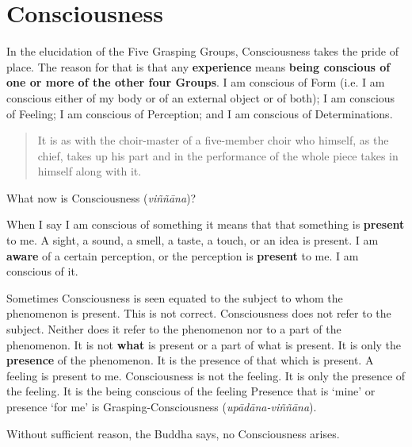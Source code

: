 \chapter{Consciousness}

In the elucidation of the Five Grasping Groups, Consciousness takes the pride of place. The reason for that is that any \textbf{experience} means \textbf{being conscious of one or more of the other four Groups}. I am conscious of Form (i.e. I am conscious either of my body or of an external object or of both); I am conscious of Feeling; I am conscious of Perception; and I am conscious of Determinations.

\begin{quote}
It is as with the choir-master of a five-member choir who himself, as the chief, takes up his part and in the performance of the whole piece takes in himself along with it.
\end{quote}

What now is Consciousness (\emph{viññāna})?

When I say I am conscious of something it means that that something is \textbf{present} to me. A sight, a sound, a smell, a taste, a touch, or an idea is present. I am \textbf{aware} of a certain perception, or the perception is \textbf{present} to me. I am conscious of it.

Sometimes Consciousness is seen equated to the subject to whom the phenomenon is present. This is not correct. Consciousness does not refer to the subject. Neither does it refer to the phenomenon nor to a part of the phenomenon. It is not \textbf{what} is present or a part of what is present. It is only the \textbf{presence} of the phenomenon. It is the presence of that which is present. A feeling is present to me. Consciousness is not the feeling. It is only the presence of the feeling. It is the being conscious of the feeling Presence that is `mine' or presence `for me' is Grasping-Consciousness (\emph{upādāna-viññāna}).

Without sufficient reason, the Buddha says, no Consciousness arises.

